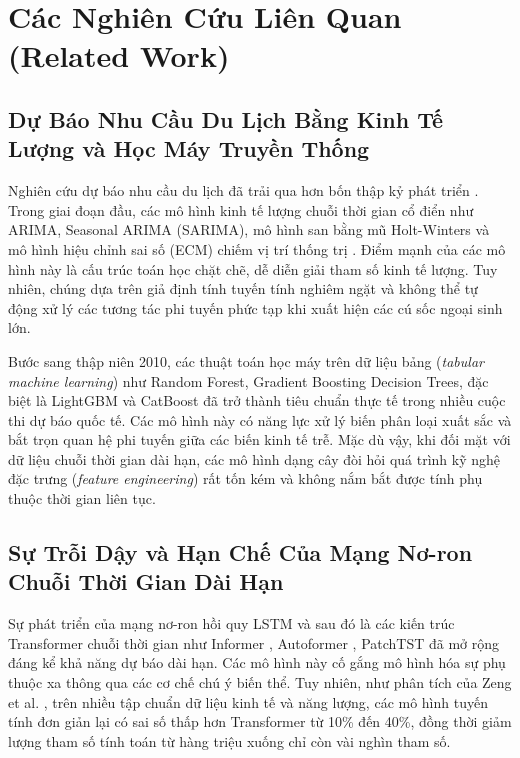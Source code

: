 \section{Các Nghiên Cứu Liên Quan (Related Work)}
\label{sec:related_work}

\subsection{Dự Báo Nhu Cầu Du Lịch Bằng Kinh Tế Lượng và Học Máy Truyền Thống}
Nghiên cứu dự báo nhu cầu du lịch đã trải qua hơn bốn thập kỷ phát triển \cite{song2021tourism}. Trong giai đoạn đầu, các mô hình kinh tế lượng chuỗi thời gian cổ điển như ARIMA, Seasonal ARIMA (SARIMA), mô hình san bằng mũ Holt-Winters và mô hình hiệu chỉnh sai số (ECM) chiếm vị trí thống trị \cite{athanasopoulos2011tourism}. Điểm mạnh của các mô hình này là cấu trúc toán học chặt chẽ, dễ diễn giải tham số kinh tế lượng. Tuy nhiên, chúng dựa trên giả định tính tuyến tính nghiêm ngặt và không thể tự động xử lý các tương tác phi tuyến phức tạp khi xuất hiện các cú sốc ngoại sinh lớn.

Bước sang thập niên 2010, các thuật toán học máy trên dữ liệu bảng (\textit{tabular machine learning}) như Random Forest, Gradient Boosting Decision Trees, đặc biệt là LightGBM \cite{ke2017lightgbm} và CatBoost \cite{dorogush2018catboost} đã trở thành tiêu chuẩn thực tế trong nhiều cuộc thi dự báo quốc tế. Các mô hình này có năng lực xử lý biến phân loại xuất sắc và bắt trọn quan hệ phi tuyến giữa các biến kinh tế trễ. Mặc dù vậy, khi đối mặt với dữ liệu chuỗi thời gian dài hạn, các mô hình dạng cây đòi hỏi quá trình kỹ nghệ đặc trưng (\textit{feature engineering}) rất tốn kém và không nắm bắt được tính phụ thuộc thời gian liên tục.

\subsection{Sự Trỗi Dậy và Hạn Chế Của Mạng Nơ-ron Chuỗi Thời Gian Dài Hạn}
Sự phát triển của mạng nơ-ron hồi quy LSTM \cite{hochreiter1997lstm, claveria2016tourism} và sau đó là các kiến trúc Transformer chuỗi thời gian như Informer \cite{zhou2021informer}, Autoformer \cite{wu2021autoformer}, PatchTST \cite{nie2023patchtst} đã mở rộng đáng kể khả năng dự báo dài hạn. Các mô hình này cố gắng mô hình hóa sự phụ thuộc xa thông qua các cơ chế chú ý biến thể. Tuy nhiên, như phân tích của Zeng et al. \cite{zeng2023dlinear}, trên nhiều tập chuẩn dữ liệu kinh tế và năng lượng, các mô hình tuyến tính đơn giản lại có sai số thấp hơn Transformer từ 10\% đến 40\%, đồng thời giảm lượng tham số tính toán từ hàng triệu xuống chỉ còn vài nghìn tham số.

